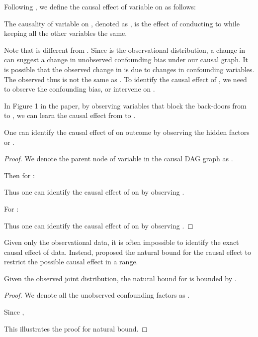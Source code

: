 \documentclass[final]{cvpr}
\begin{document}
\begin{subappendices}
Following \cite{pearl}, we define the causal effect of variable  on  as follows:

\begin{definition}
The causality of variable  on , denoted as , is the effect of conducting  to  while keeping all the other variables the same.
\end{definition}

Note that  is different from . Since  is the observational distribution, a change in  can suggest a change in unobserved confounding bias under our causal graph. It is possible that the observed change in  is due to changes in confounding variables.
The observed  thus is not the same as . To identify the causal effect of , we need to observe the confounding bias, or intervene on .

In Figure 1 in the paper, by observing variables that block the back-doors from  to , we can learn the causal effect from  to .

\begin{theorem} 
One can identify the causal effect of  on outcome  by observing the hidden factors  or .
\end{theorem}

\begin{proof}
We denote the parent node of variable  in the causal DAG graph as .

Then for :


Thus one can identify the causal effect of  on  by observing .


For :


Thus one can identify the causal effect of  on  by observing .

\end{proof}


Given only the observational data, it is often impossible to identify the exact causal effect of data. Instead, \cite{pearl} proposed the natural bound for the causal effect to restrict the possible causal effect in a range.

\begin{lemma}
Given the observed joint distribution, the natural bound for  is bounded by .
\end{lemma}

\begin{proof}
We denote all the unobserved confounding factors as . 




Since ,


This illustrates the proof for natural bound. 
\end{proof}



\end{subappendices}
\end{document}
